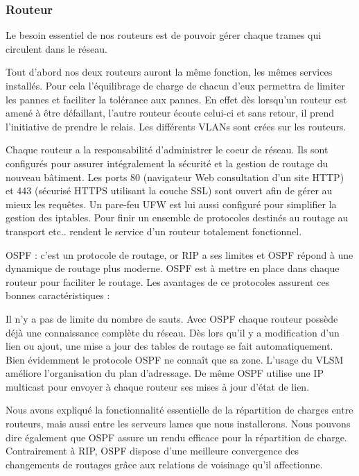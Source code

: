 %
\subsubsection{Routeur}

Le besoin essentiel de nos routeurs est de pouvoir gérer chaque trames qui circulent dans le réseau.

Tout d'abord nos deux routeurs auront la même fonction, les mêmes services installés.
Pour cela l'équilibrage de charge de chacun d'eux permettra de limiter les pannes et faciliter la tolérance aux pannes. En effet dès lorsqu'un routeur est amené à être défaillant, l'autre routeur écoute celui-ci et sans retour, il prend l'initiative de prendre le relais. Les différents VLANs sont crées sur les routeurs.

Chaque routeur a la responsabilité d'administrer le coeur de réseau. Ils sont configurés pour assurer intégralement la sécurité et la gestion de routage du nouveau bâtiment.
Les ports 80 (navigateur Web consultation d'un site HTTP)  et 443 (sécurisé HTTPS utilisant la couche SSL) sont ouvert afin de gérer au mieux les requêtes. Un pare-feu UFW est lui aussi configuré pour simplifier la gestion des iptables. Pour finir un ensemble de protocoles destinés au routage au transport etc.. rendent le service d'un routeur totalement fonctionnel.

OSPF :
c'est un protocole de routage, or RIP a ses limites et OSPF répond à une dynamique de routage plus moderne. OSPF est à mettre en place dans chaque routeur pour faciliter le routage.
Les avantages de ce protocoles assurent ces bonnes caractéristiques :

Il n'y a pas de limite du nombre de sauts. Avec OSPF chaque routeur possède déjà une connaissance complète du réseau. Dès lors qu'il y a modification d'un lien ou ajout, une mise a jour des tables de routage se fait automatiquement.
Bien évidemment le protocole OSPF ne connaît que sa zone.
L'usage du VLSM améliore l'organisation du plan d'adressage. De même OSPF utilise une IP multicast pour envoyer à chaque routeur ses mises à jour d'état de lien.

Nous avons expliqué la fonctionnalité essentielle de la répartition de charges entre routeurs, mais aussi entre les serveurs lames que nous installerons. Nous pouvons dire également que OSPF assure un rendu efficace pour la répartition de charge. Contrairement à RIP, OSPF dispose d'une meilleure convergence des changements de routages grâce aux relations de voisinage qu'il affectionne.

